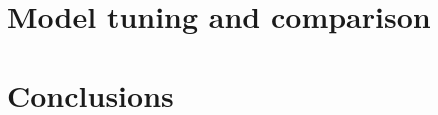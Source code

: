 \documentclass{midl}
\begin{document}
\section{Model tuning and comparison}
\label{sec:evaluation}

\section{Conclusions}
\label{sec:conclusion}

\newpage

\end{document}
